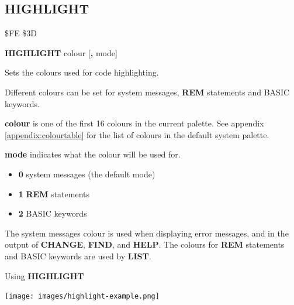 \subsection{HIGHLIGHT}
\begin{description}[leftmargin=2cm,style=nextline]
\item [Token:]    \$FE \$3D

\item [Format:]   {\bf HIGHLIGHT} colour [{\bf,} mode]

\item [Usage:]    Sets the colours used for code highlighting.

                  Different colours can be set for system messages, {\bf REM} statements and BASIC keywords.

                  {\bf colour} is one of the first 16 colours in the current palette. See appendix \vref{appendix:colourtable} for the list of colours in the default system palette.

                  {\bf mode} indicates what the colour will be used for.
                  \begin{itemize}
                     \item {\bf 0} system messages (the default mode)
                     \item {\bf 1} {\bf REM} statements
                     \item {\bf 2} BASIC keywords
                  \end{itemize}

\item [Remarks:]  The system messages colour is used when displaying error messages, and in the output of {\bf CHANGE}, {\bf FIND}, and {\bf HELP}. The colours for {\bf REM} statements and BASIC keywords are used by {\bf LIST}.

\item [Example:]  Using {\bf HIGHLIGHT}

\item \begin{center}\texttt{[image: images/highlight-example.png]}\end{center}

\end{description}


\newpage
